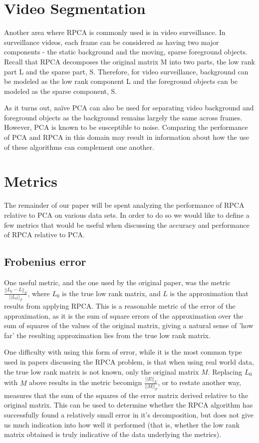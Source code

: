 \documentclass[11pt]{scrartcl} %
\theoremstyle{plain}
\begin{document}
\section{Video Segmentation}

Another area where RPCA is commonly used is in video surveillance. In surveillance videos, each frame can be considered as having two major components - the static background and the moving, sparse foreground objects. Recall that RPCA decomposes the original matrix M into two parts, the low rank part L and the sparse part, S. Therefore, for video surveillance, background can be modeled as the low rank component L and the foreground objects can be modeled as the sparse component, S.

As it turns out, naïve PCA can also be used for separating video background and foreground objects as the background remains largely the same across frames. However, PCA is known to be susceptible to noise. Comparing the performance of PCA and RPCA in this domain may result in information about how the use of these algorithms can complement one another.

\section{Metrics}
The remainder of our paper will be spent analyzing the performance of RPCA relative to PCA on various data sets. In order to do so we would like to define a few metrics that would be useful when discussing the accuracy and performance of RPCA relative to PCA.

\subsection{Frobenius error}
One useful metric, and the one used by the original paper, was the metric $\frac{||L_0 - L||_F}{||L_0||_F}$, where $L_0$ is the true low rank matrix, and $L$ is the approximation that results from applying RPCA. This is a reasonable metric of the error of the approximation, as it is the sum of square errors of the approximation over the sum of squares of the values of the original matrix, giving a natural sense of 'how far' the resulting approximation lies from the true low rank matrix.

One difficulty with using this form of error, while it is the most common type used in papers discussing the RPCA problem, is that when using real world data, the true low rank matrix is not known, only the original matrix $M$. Replacing $L_0$ with $M$ above results in the metric becomign $\frac{||E||_F}{||M||_F}$, or to restate another way, measures that the sum of the squares of the error matrix derived relative to the original matrix. This can be used to determine whether the RPCA algorithm has successfully found a relatively small error in it's decomposition, but does not give us much indication into how well it performed (that is, whether the low rank matrix obtained is truly indicative of the data underlying the metrics).
\end{document}
